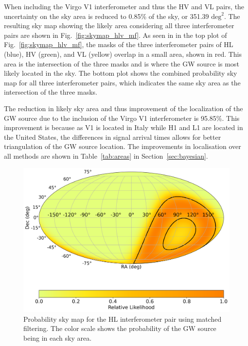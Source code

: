 \documentclass[11pt,a4paper]{article}
\begin{document}
When including the Virgo V1 interferometer and thus the HV and VL pairs, the uncertainty on the sky area is reduced to 0.85\% of the sky, or 351.39 $\mathrm{deg}^2$. The resulting sky map showing the likely area considering all three interferometer pairs are shown in Fig.~\ref{fig:skymap_hlv_mf}. As seen in in the top plot of Fig.~\ref{fig:skymap_hlv_mf}, the masks of the three interferometer pairs of HL (blue), HV (green), and VL (yellow) overlap in a small area, shown in red. This area is the intersection of the three masks and is where the GW source is most likely located in the sky. The bottom plot shows the combined probability sky map for all three interferometer pairs, which indicates the same sky area as the intersection of the three masks.

The reduction in likely sky area and thus improvement of the localization of the GW source due to the inclusion of the Virgo V1 interferometer is 95.85\%. This improvement is because as V1 is located in Italy while H1 and L1 are located in the United States, the differences in signal arrival times allows for better triangulation of the GW source location. The improvements in localisation over all methods are shown in Table~\ref{tab:areas} in Section~\ref{sec:bayesian}.

\begin{figure}
    \includegraphics[width=\columnwidth, keepaspectratio]{../figures/detector_skymap_HL.png}
    \caption{Probability sky map for the HL interferometer pair using matched filtering. The color scale shows the probability of the GW source being in each sky area.}
    \label{fig:skymap_hl_mf}
\end{figure}
\end{document}
